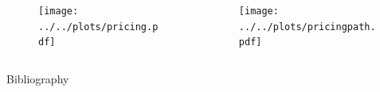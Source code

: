 \documentclass{beamer}
\begin{document}
\begin{frame}
    \begin{columns}
        \begin{column}{.46\textwidth}
            \begin{figure}
                \texttt{[image: ../../plots/pricing.pdf]}
            \end{figure}
        \end{column}

        \hfill

        \begin{column}{.46\textwidth}
            \begin{figure}
                \texttt{[image: ../../plots/pricingpath.pdf]}
            \end{figure}
        \end{column}
    \end{columns}
\end{frame}

\begin{frame}[allowframebreaks]{Bibliography}
    \printbibliography
\end{frame}
\end{document}
